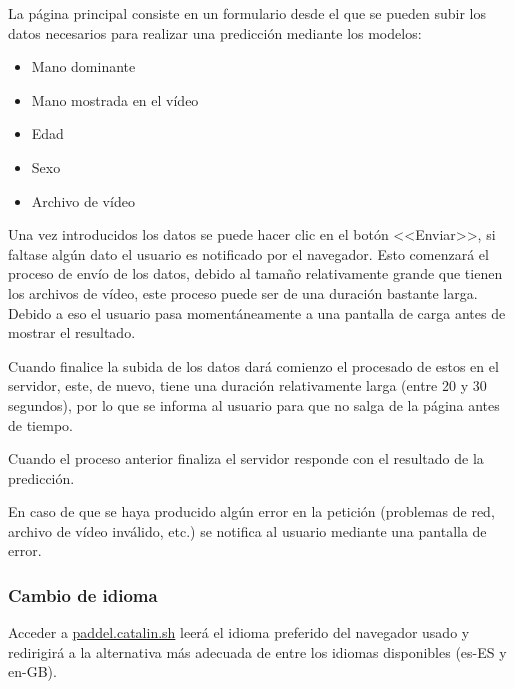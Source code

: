 La página principal consiste en un formulario desde el que se pueden subir los
datos necesarios para realizar una predicción mediante los modelos:

\begin{itemize}
    \item Mano dominante
    \item Mano mostrada en el vídeo
    \item Edad
    \item Sexo
    \item Archivo de vídeo
\end{itemize}


Una vez introducidos los datos se puede hacer clic en el botón <<Enviar>>, si
faltase algún dato el usuario es notificado por el navegador. Esto comenzará el
proceso de envío de los datos, debido al tamaño relativamente grande que tienen
los archivos de vídeo, este proceso puede ser de una duración bastante larga.
Debido a eso el usuario pasa momentáneamente a una pantalla de carga antes de
mostrar el resultado.


Cuando finalice la subida de los datos dará comienzo el procesado de estos en el
servidor, este, de nuevo, tiene una duración relativamente larga (entre 20 y 30
segundos), por lo que se informa al usuario para que no salga de la página antes
de tiempo.


Cuando el proceso anterior finaliza el servidor responde con el resultado de la
predicción.


En caso de que se haya producido algún error en la petición (problemas de red,
archivo de vídeo inválido, etc.) se notifica al usuario mediante una pantalla de
error.


\subsubsection{Cambio de idioma}

Acceder a \href{https://paddle.catalin.sh}{paddel.catalin.sh} leerá el idioma
preferido del navegador usado y redirigirá a la alternativa más adecuada de
entre los idiomas disponibles (es-ES y en-GB).

